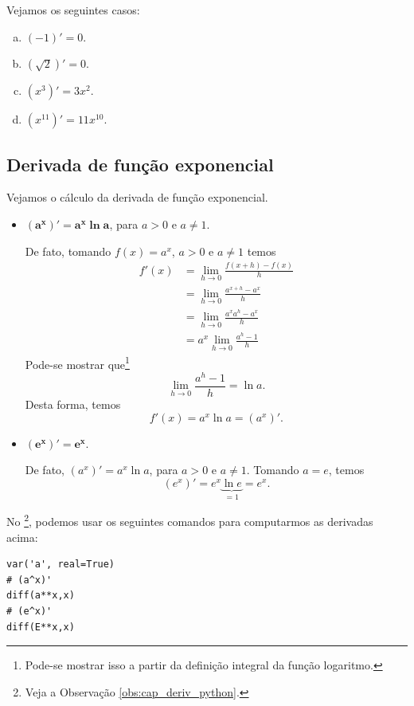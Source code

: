 \begin{ex}
  Vejamos os seguintes casos:
  \begin{enumerate}[a)]
  \item $(-1)' = 0$.
  \item $(\sqrt{2})' = 0$.
  \item $(x^3)' = 3x^2$.
  \item $(x^{11})' = 11x^{10}$.
  \end{enumerate}
\end{ex}

\subsection{Derivada de função exponencial}

Vejamos o cálculo da derivada de função exponencial.

\begin{itemize}
\item $\pmb{(a^x)' = a^x\ln a}$, para $a>0$ e $a\neq 1$.
  
  De fato, tomando $f(x) = a^x$, $a>0$ e $a\neq 1$ temos
  \begin{align}
    f'(x) &= \lim_{h\to 0} \frac{f(x+h)-f(x)}{h}\\
          &= \lim_{h\to 0} \frac{a^{x+h}-a^x}{h} \\
          &= \lim_{h\to 0} \frac{a^xa^h-a^x}{h} \\
          &= a^x \lim_{h\to 0} \frac{a^h-1}{h}
  \end{align}
  Pode-se mostrar que\footnote{Pode-se mostrar isso a partir da definição integral da função logaritmo.}
  \begin{equation}
    \lim_{h\to 0} \frac{a^h-1}{h} = \ln a.
  \end{equation}
  Desta forma, temos
  \begin{equation}
    f'(x) = a^x\ln a = (a^x)'.
  \end{equation}

\item $\pmb{(e^x)' = e^x}$.

  De fato, $(a^x)' = a^x\ln a$, para $a>0$ e $a\neq 1$. Tomando $a = e$, temos
  \begin{equation}
    (e^x)' = e^x\underbrace{\ln e}_{=1} = e^x.
  \end{equation}
\end{itemize}

\ifispython
No \sympy\footnote{Veja a Observação \ref{obs:cap_deriv_python}.}, podemos usar os seguintes comandos para computarmos as derivadas acima:
\begin{verbatim}
var('a', real=True)
# (a^x)'
diff(a**x,x)
# (e^x)'
diff(E**x,x)
\end{verbatim}
\fi


